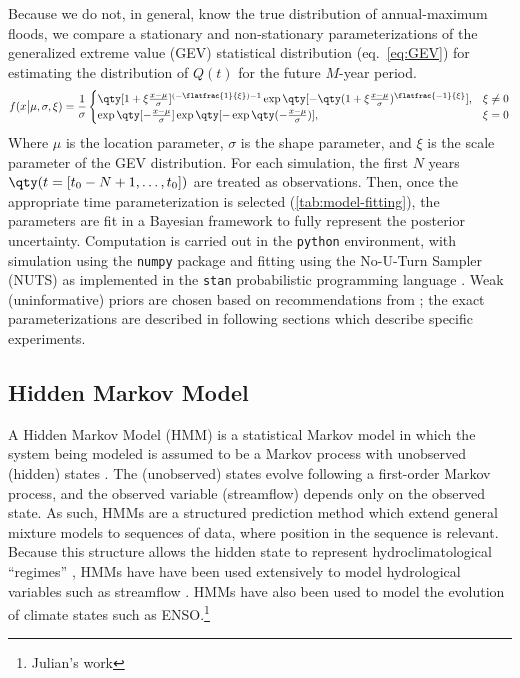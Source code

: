\documentclass[11pt]{article}
\begin{document}
Because we do not, in general, know the true distribution of annual-maximum floods, we compare a stationary and non-stationary parameterizations of the generalized extreme value (GEV) statistical distribution (eq.~\ref{eq:GEV}) for estimating the distribution of $Q(t)$ for the future $M$-year period.
\begin{equation}
  \label{eq:GEV}
  f(x \big| \mu, \sigma, \xi) = \frac{1}{\sigma}
    \begin{cases}
      \qty[1 + \xi \frac{x - \mu}{\sigma}] ^ {(-\flatfrac{1}{\xi})-1} \exp \qty[-\qty(1+\xi \frac{x - \mu}{\sigma})^{\flatfrac{-1}{\xi}}], & \xi \neq 0 \\
      \exp \qty[-\frac{x-\mu}{\sigma}] \exp \qty[- \exp \qty(- \frac{x-\mu}{\sigma})], & \xi = 0
    \end{cases}
\end{equation}
Where $\mu$ is the location parameter, $\sigma$ is the shape parameter, and $\xi$ is the scale parameter of the GEV distribution.
For each simulation, the first $N$ years $\qty(t=[t_0-N+1, \ldots, t_0])$ are treated as observations.
Then, once the appropriate time parameterization is selected (\cref{tab:model-fitting}), the parameters are fit in a Bayesian framework to fully represent the posterior uncertainty.
Computation is carried out in the \texttt{python} environment, with simulation using the \texttt{numpy} package \citep{vanderWalt2011} and fitting using the No-U-Turn Sampler (NUTS) \citep{Hoffman2014} as implemented in the \texttt{stan} probabilistic programming language \citep{Carpenter2016}.
Weak (uninformative) priors are chosen based on recommendations from \citet{Martins2000}; the exact parameterizations are described in following sections which describe specific experiments.

\subsection{Hidden Markov Model \label{sec:HMM}}

A Hidden Markov Model (HMM) is a statistical Markov model in which the system being modeled is assumed to be a Markov process with unobserved (\ie hidden) states \citep{Rabiner1986}.
The (unobserved) states evolve following a first-order Markov process, and the observed variable (\ie streamflow) depends only on the observed state.
As such, HMMs are a structured prediction method which extend general mixture models to sequences of data, where position in the sequence is relevant.
Because this structure allows the hidden state to represent hydroclimatological ``regimes'' \citep{Reinhold1982,Michelangeli1995,Merz2014}, HMMs have have been used extensively to model hydrological variables such as streamflow \citep{Bracken2016}.
HMMs have also been used to model the evolution of climate states such as ENSO.\footnote{Julian's work}
\end{document}
